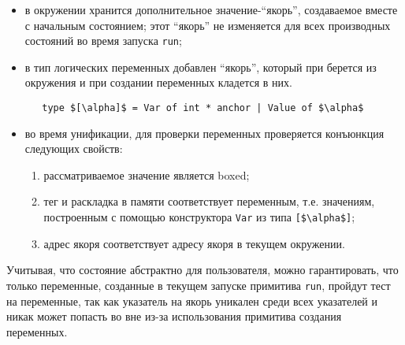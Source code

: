 \begin{itemize}
\item в окружении хранится дополнительное значение-\enquote{якорь}, создаваемое вместе с начальным состоянием; этот \enquote{якорь} не изменяется для всех производных состояний во время запуска \lstinline=run=;
\item  в тип логических переменных добавлен \enquote{якорь}, который при берется из окружения и при создании переменных кладется в них.

\begin{lstlisting}
   type $[\alpha]$ = Var of int * anchor | Value of $\alpha$
\end{lstlisting}


\item во время унификации, для проверки переменных проверяется конъюнкция следующих свойств:

  \begin{enumerate}
    \item рассматриваемое значение является boxed;
    \item тег и раскладка в памяти соответствует переменным, т.е. значениям, построенным с помощью конструктора \lstinline|Var| из типа \lstinline{[$\alpha$]};
    \item адрес якоря соответствует адресу якоря в текущем окружении.
  \end{enumerate}
\end{itemize}

Учитывая, что состояние абстрактно для пользователя, можно гарантировать, что только переменные, созданные в текущем запуске примитива \lstinline=run=, пройдут тест на переменные, так как указатель на якорь уникален среди всех указателей и никак может попасть во вне из-за использования примитива создания переменных.

